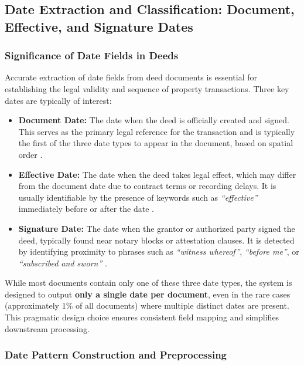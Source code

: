 \documentclass{article}
\begin{document}
\subsection{Date Extraction and Classification: Document, Effective, and Signature Dates}

\subsubsection{Significance of Date Fields in Deeds}

Accurate extraction of date fields from deed documents is essential for establishing the legal validity and sequence of property transactions. Three key dates are typically of interest:
\begin{itemize}
    \item \textbf{Document Date:} The date when the deed is officially created and signed. This serves as the primary legal reference for the transaction and is typically the first of the three date types to appear in the document, based on spatial order \cite{johnantell_document_dates}.
    \item \textbf{Effective Date:} The date when the deed takes legal effect, which may differ from the document date due to contract terms or recording delays. It is usually identifiable by the presence of keywords such as \textit{``effective''} immediately before or after the date \cite{fastercapital_effective_dates}.
    \item \textbf{Signature Date:} The date when the grantor or authorized party signed the deed, typically found near notary blocks or attestation clauses. It is detected by identifying proximity to phrases such as \textit{``witness whereof''}, \textit{``before me''}, or \textit{``subscribed and sworn''} \cite{cassiefinance_signature_date}.
\end{itemize}

While most documents contain only one of these three date types, the system is designed to output \textbf{only a single date per document}, even in the rare cases (approximately 1\% of all documents) where multiple distinct dates are present. This pragmatic design choice ensures consistent field mapping and simplifies downstream processing.

\subsubsection{Date Pattern Construction and Preprocessing}
\end{document}

